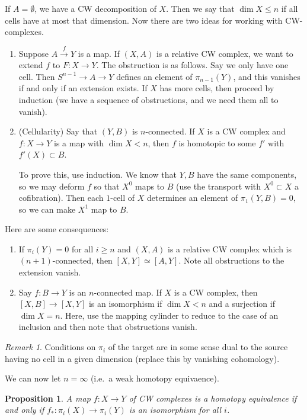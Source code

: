 \documentclass[leqno, openany]{memoir}
\newtheorem{prop}[thm]{Proposition}
\theoremstyle{definition}
\theoremstyle{remark}
\newtheorem{rmk}[thm]{Remark}
\theoremstyle{plain}
\theoremstyle{definition}
\theoremstyle{remark}
\begin{document}
If $A = \emptyset$, we have a CW decomposition of $X$. Then we say that $\dim X \leq n$ if all cells have at most that dimension. Now there are two ideas for working with CW-complexes.

\begin{enumerate}
    \item Suppose $A \xrightarrow{f} Y$ is a map. If $(X,A)$ is a relative CW complex, we want to extend $f$ to $F \colon X \to Y$. The obstruction is as follows. Say we only have one cell. Then $S^{n-1} \to A \to Y$ defines an element of $\pi_{n-1}(Y)$, and this vanishes if and only if an extension exists. If $X$ has more cells, then proceed by induction (we have a sequence of obstructions, and we need them all to vanish).
    \item (Cellularity) Say that $(Y,B)$ is $n$-connected. If $X$ is a CW complex and $f \colon X \to Y$ is a map with $\dim X < n$, then $f$ is homotopic to some $f'$ with $f'(X) \subset B$.

        To prove this, use induction. We know that $Y,B$ have the same components, so we may deform $f$ so that $X^0$ maps to $B$ (use the transport with $X^0 \subset X$ a cofibration). Then each $1$-cell of $X$ determines an element of $\pi_1(Y,B) = 0$, so we can make $X^1$ map to $B$.
\end{enumerate}

Here are some consequences:
\begin{enumerate}
    \item If $\pi_i(Y) = 0$ for all $i \geq n$ and $(X,A)$ is a relative CW complex which is $(n+1)$-connected, then $[X,Y] \simeq [A,Y]$. Note all obstructions to the extension vanish.
    \item Say $f \colon B \to Y$ is an $n$-connected map. If $X$ is a CW complex, then $[X,B] \to [X,Y]$ is an isomorphism if $\dim X < n$ and a surjection if $\dim X = n$. Here, use the mapping cylinder to reduce to the case of an inclusion and then note that obstructions vanish.
\end{enumerate}

\begin{rmk}
    Conditions on $\pi_i$ of the target are in some sense dual to the source having no cell in a given dimension (replace this by vanishing cohomology).
\end{rmk}

We can now let $n = \infty$ (i.e.~a weak homotopy equivaence).

\begin{prop}
    A map $f \colon X \to Y$ of CW complexes is a homotopy equivalence if and only if $f_* \colon \pi_i(X) \to \pi_i(Y)$ is an isomorphism for all $i$.
\end{prop}
\end{document}
